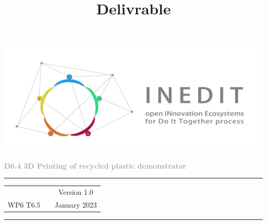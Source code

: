 \documentclass[
  11pt,
]{article}
\title{Delivrable}
\author{}
\date{}
\begin{document}
\maketitle

\begin{titlepage}
	\begin{center}

		\vspace{30mm}
		
		\includegraphics[width=\linewidth]{figures/Inedit_horiz.pdf}\\ 
		
		\vfill
		
		\textbf{\Huge{\textcolor{darkgray}{ D6.4 3D Printing of recycled plastic demonstrator }}} \\ 
		
		\vfill
		
		\vspace{60mm} 
		
		
		
      \textcolor{gray}{\rule{\textwidth}{2pt}}
      
		\vspace{5pt}
		\begin{tabular}{ c p{8cm} c }
           & & Version 1.0  \\ 
         WP6 T6.5  & & January 2023   \\ 
      \end{tabular}
		\vspace{5pt} 
		
		\textcolor{gray}{\rule{\textwidth}{2pt}}
		
		
	
		
		\vfill
		
	\end{center}
\end{titlepage}

\newpage
\end{document}
